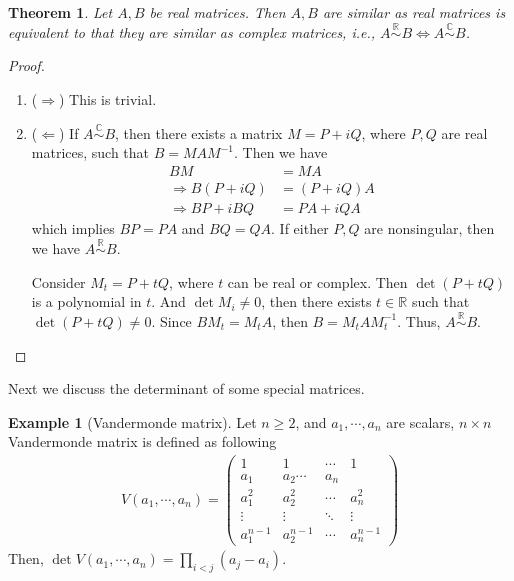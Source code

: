 \documentclass[11pt]{book}
\newtheorem{theorem}{Theorem}[section]
\theoremstyle{definition}
\newtheorem{example}{Example}[section]
\numberwithin{equation}{subsection}
\begin{document}
\medskip

\begin{theorem}
Let $A,B$ be real matrices. Then $A,B$ are similar as real matrices is equivalent to that they are similar as complex matrices, i.e., $A \overset{\mathbb{R}}{\sim} B\iff A \overset{\mathbb{C}}{\sim} B$.
\end{theorem}
\begin{proof}
~\begin{enumerate}[label=(\arabic*)]
    \item ($\Rightarrow$) This is trivial.
    \item ($\Leftarrow$) If $A \overset{\mathbb{C}}{\sim} B$, then there exists a matrix $M = P + iQ$, where $P,Q$ are real matrices, such that $B = MAM^{-1}$. Then we have
    \begin{align*}
        BM & = MA \\
        \Rightarrow B(P + iQ) & = (P + iQ)A \\
        \Rightarrow BP + i BQ & = PA + i QA
    \end{align*}
    which implies $BP=PA$ and $BQ = QA$. If either $P,Q$ are nonsingular, then we have $A \overset{\mathbb{R}}{\sim} B$.
    
    Consider $M_t = P + tQ$, where $t$ can be real or complex. Then $\det (P+tQ)$ is a polynomial in $t$. And $\det M_i \neq 0$, then there exists $t\in\mathbb{R}$ such that $\det (P+tQ)\neq 0$. Since $BM_t = M_t A$, then $B = M_t A M_t^{-1}$. Thus, $A \overset{\mathbb{R}}{\sim} B$.
\end{enumerate}
\end{proof}

\medskip

Next we discuss the determinant of some special matrices.

\begin{example}[Vandermonde matrix]
Let $n\geq 2$, and $a_1, \cdots, a_n$ are scalars, $n\times n$ Vandermonde matrix is defined as following
\begin{align*}
    V(a_1,\cdots,a_n) = \left(\begin{matrix}
        1 & 1 & \cdots & 1\\
        a_1 & a_2 \cdots & a_n \\
        a_1^2 & a_2^2 & \cdots & a_n^2 \\
        \vdots & \vdots & \ddots & \vdots \\
        a_1^{n-1} & a_2^{n-1} & \cdots & a_n^{n-1}
    \end{matrix}\right)
\end{align*}
Then, $\det V(a_1,\cdots,a_n) = \prod_{i < j}(a_j - a_i)$.
\end{example}
\end{document}
